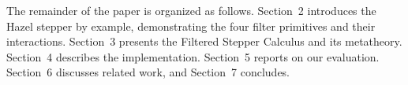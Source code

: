 The remainder of the paper is organized as follows.
Section~2 introduces the Hazel stepper by example, demonstrating the
four filter primitives and their interactions.
Section~3 presents the Filtered Stepper Calculus and its
metatheory.
Section~4 describes the implementation.
Section~5 reports on our evaluation.
Section~6 discusses related work, and Section~7 concludes.

